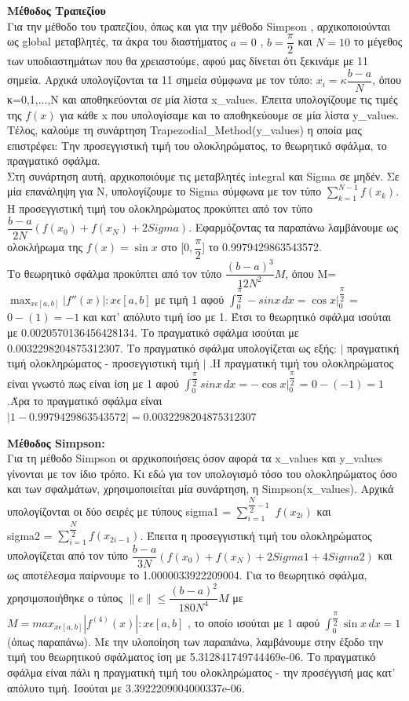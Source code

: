 \documentclass{article}
\begin{document}
\par\textbf{Μέθοδος Τραπεζίου} \\
Για την μέθοδο του τραπεζίου, όπως και για την μέθοδο Simpson , αρχικοποιούνται ως global μεταβλητές,
τα άκρα του διαστήματος $a = 0$ , $b = \dfrac{\pi}{2} $ και $N=10$ το μέγεθος των υποδιαστημάτων που
θα χρειαστούμε, αφού μας δίνεται ότι ξεκινάμε με 11 σημεία. Αρχικά υπολογίζονται τα 11 σημεία 
σύμφωνα με τον τύπο: $ x_i = κ\dfrac{b-a}{N} $, όπου κ=0,1,...,N και αποθηκεύονται σε μία λίστα
x\_values. Έπειτα υπολογίζουμε τις τιμές της $f(x)$ για κάθε x που υπολογίσαμε και το
αποθηκεύουμε σε μία λίστα y\_values. Τέλος, καλούμε τη συνάρτηση Trapezodial\_Method(y\_values) η οποία μας επιστρέφει: Την προσεγγιστική τιμή
του ολοκληρώματος, το θεωρητικό σφάλμα, το πραγματικό σφάλμα.\\
Στη συνάρτηση αυτή, αρχικοποιόυμε τις μεταβλητές integral και Sigma σε μηδέν.
Σε μία επανάληψη για N, υπολογίζουμε το Sigma σύμφωνα με
τον τύπο $\sum_{k=1}^{N-1} f(x_k)$. Η προσεγγιστική τιμή του ολοκληρώματος προκύπτει από τον 
τύπο $ \dfrac{b-a}{2N}\left(f(x_0) + f(x_N) + 2Sigma \right)$. Εφαρμόζοντας τα παραπάνω λαμβάνουμε ως ολοκλήρωμα της $f(x) = \sin{x}$ στο
[$0,\dfrac{\pi}{2}$] το 0.9979429863543572. \\Το θεωρητικό σφάλμα προκύπτει από τον τύπο
$ \dfrac{\left(b-a\right)^3}{12N^2} M$, όπου Μ= $ \max_{x\epsilon [a,b]}|f''(x)|: x\epsilon [a,b]$ με τιμή 1 αφού $ \int_{0}^{\dfrac{\pi}{2}} -sin{x} \,dx =  \cos{x} \big|_0^\dfrac{\pi}{2}$ = $0 - (1) = -1$ και κατ' απόλυτο τιμή ίσο με 1. Έτσι το θεωρητικό σφάλμα ισούται με 0.0020570136456428134. Το πραγματικό σφάλμα ισούται με 0.0032298204875312307. Το πραγματικό σφάλμα
υπολογίζεται ως εξής:  $|$ πραγματική τιμή ολοκληρώματος - προσεγγιστική τιμή $|$ .Η πραγματική τιμή του ολοκληρώματος είναι γνωστό πως είναι ίση με 1 αφού $ \int_{0}^{\dfrac{\pi}{2}} sin{x} \,dx =  -\cos{x} \big|_0^\dfrac{\pi}{2}$ = $0 - (-1) = 1$ .Άρα το πραγματικό σφάλμα είναι 
$\lvert 1 - 0.9979429863543572\rvert = 0.0032298204875312307 $ 
\par\large\textbf{Μέθοδος Simpson:}\\
Για τη μέθοδο Simpson οι αρχικοποιήσεις όσον αφορά τα x\_values και y\_values γίνονται με τον ίδιο τρόπο. Κι εδώ για τον υπολογισμό τόσο του ολοκληρώματος όσο και των σφαλμάτων, χρησιμοποιείται μία συνάρτηση, η Simpson(x\_values). Αρχικά υπολογίζονται οι δύο σειρές με τύπους
sigma1 = $\sum_{i=1}^{\dfrac{N}{2}-1}$ $f(x_{2i})$  και \\
sigma2 = $\sum_{i=1}^{\dfrac{N}{2}} f(x_{2i-1})$. Έπειτα η προσεγγιστική τιμή του ολοκληρώματος υπολογίζεται από τον τύπο $ \dfrac{b-a}{3N}\left(f(x_0) + f(x_N) + 2Sigma1 + 4Sigma2 \right)$ και ως αποτέλεσμα παίρνουμε το 1.0000033922209004.
Για το θεωρητικό σφάλμα, χρησιμοποιήθηκε ο τύπος $\|e\| \leq \dfrac{\left(b-a\right)^2}{180N^4}M$ με \\
$M= max_{x\epsilon [a,b]}|f^{(4)}(x)|: x\epsilon [a,b]$ , το οποίο ισούται με 1 αφού
$\int_0^{\dfrac{\pi}{2}} \sin{x} \,dx = 1 $ (όπως παραπάνω).  Με την υλοποίηση των παραπάνω, λαμβάνουμε στην έξοδο την τιμή του θεωρητικού σφάλματος ίση με 5.312841749744469e-06. Το πραγματικό σφάλμα είναι πάλι η πραγματική τιμή του ολοκληρώματος - την προσέγγισή μας κατ' απόλυτο τιμή. Ισούται με  3.3922209004000337e-06.
\end{document}
